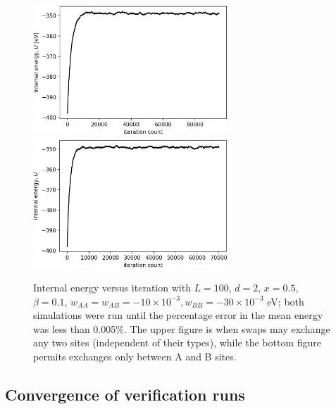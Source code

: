 \documentclass[10pt]{article}
\begin{document}
\begin{figure}[h!]
\centering
\includegraphics[width=0.65\textwidth]{Figures/swap_any_two_convergence.png}
\includegraphics[width=0.65\textwidth]{Figures/swap_A_B_only_convergence.png}
\caption{Internal energy versus iteration with $L=100$, $d=2$, $x=0.5$, $\beta=0.1$, $w_{AA}=w_{AB}=-10 \times 10^{-3},w_{BB} = -30 \times 10^{-3}$ eV; both simulations were run until the percentage error in the mean energy was less than 0.005\%.
The upper figure is when swaps may exchange any two sites (independent of their types), while the bottom figure permits exchanges only between A and B sites.}
\label{fig:swap}
\end{figure}

\subsection{Convergence of verification runs}
\end{document}
